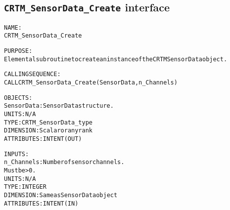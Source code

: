 \subsection{\texttt{CRTM\_SensorData\_Create} interface}
  \label{sec:CRTM_SensorData_Create_interface}
  \begin{alltt}
 
  NAME:
        CRTM_SensorData_Create
  
  PURPOSE:
        Elemental subroutine to create an instance of the CRTM SensorData object.
 
  CALLING SEQUENCE:
        CALL CRTM_SensorData_Create( SensorData, n_Channels )
 
  OBJECTS:
        SensorData:   SensorData structure.
                      UNITS:      N/A
                      TYPE:       CRTM_SensorData_type
                      DIMENSION:  Scalar or any rank
                      ATTRIBUTES: INTENT(OUT)
 
  INPUTS:
        n_Channels:   Number of sensor channels.
                      Must be > 0.
                      UNITS:      N/A
                      TYPE:       INTEGER
                      DIMENSION:  Same as SensorData object
                      ATTRIBUTES: INTENT(IN)
 
  \end{alltt}
